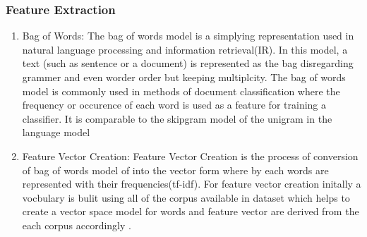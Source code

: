 \subsubsection{Feature Extraction}
\begin{enumerate}
\item Bag of Words:
 The bag of words model is a simplying representation used in natural language processing and information retrieval(IR). In this model, a text (such as sentence or a document) is represented as the bag disregarding grammer and even worder order but keeping multiplcity. The bag of words model is commonly used in methods of document classification where the frequency or occurence of each word is used as a feature for training a classifier. It is comparable to the skipgram model of the unigram in the language model \cite{vector}

\item Feature Vector Creation: 
 Feature Vector Creation is the process of conversion of bag of words model of into the vector form where by each words are represented with their frequencies(tf-idf). For feature vector creation initally a vocbulary is bulit using all of the corpus available in dataset which helps to create a vector space model for words and feature vector are derived from the each corpus accordingly \cite{vector}.
\end{enumerate}

